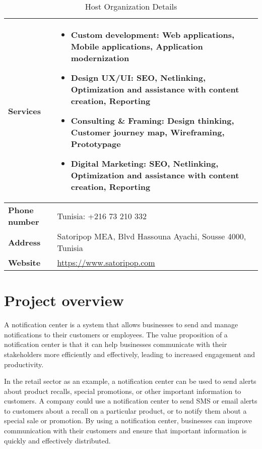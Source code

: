\begin{table}[hbt!]
    \centering
    \begin{tabular}{ | m{} | m{} | }
        \hline
        \textbf{Services} & 
        \vspace*{.5cm}
        \begin{itemize}[leftmargin=0.5cm]
            \item \textbf{Custom development:} Web applications, Mobile applications, Application modernization
            \item \textbf{Design UX/UI:} SEO, Netlinking, Optimization and assistance with content creation, Reporting 
            \item \textbf{Consulting \& Framing:} Design thinking, Customer journey map, Wireframing, Prototypage
            \item \textbf{Digital Marketing:} SEO, Netlinking, Optimization and assistance with content creation, Reporting
        \end{itemize} \\
        \hline
        \textbf{Phone number} & Tunisia: +216 73 210 332 \\
        \hline
        \textbf{Address} & Satoripop MEA, Blvd Hassouna Ayachi, Sousse 4000, Tunisia \\
        \hline
        \textbf{Website} & \url{https://www.satoripop.com} \\
        \hline
    \end{tabular}
    \caption{Host Organization Details}
\end{table}

\section{Project overview}
A notification center is a system that allows businesses to send and manage notifications
to their customers or employees. The value proposition of a notification center is that it
can help businesses communicate with their stakeholders more efficiently and
effectively, leading to increased engagement and productivity.

In the retail sector as an example, a notification center can be used to send alerts about product 
recalls, special promotions, or other important information to customers. A company could use a 
notification center to send SMS or email alerts to customers about a recall on a particular product, 
or to notify them about a special sale or promotion. By using a notification center, businesses can 
improve communication with their customers and ensure that important information is quickly and 
effectively distributed.

